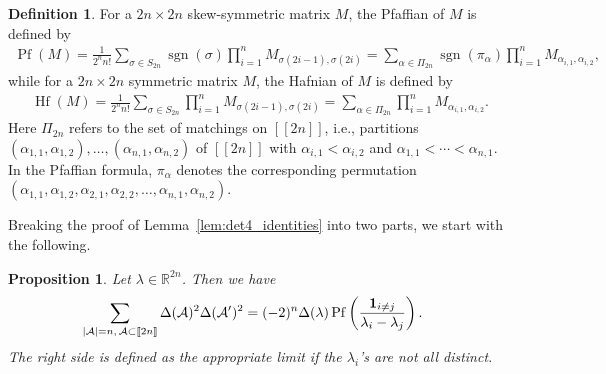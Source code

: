 \documentclass[pdftex]{sigma}
\numberwithin{equation}{section}
\newtheorem{Proposition}[Theorem]{Proposition}
\theoremstyle{definition}
\newtheorem{Definition}[Theorem]{Definition}
\newcommand{\R}{{\mathbb R}}
\newcommand{\ind}{{\bf{1}}}
\newcommand{\sgn}{\operatorname{sgn}}
\newcommand{\Pf}{\operatorname{Pf}}
\newcommand{\Hf}{\operatorname{Hf}}
\newcommand{\cA}{\mathcal{A}}
\newcommand{\lst}[1]{[\![#1 ]\!]}
\begin{document}
\begin{Definition}\label{def:PfaffHaf}
For a $2n \times 2n$ skew-symmetric matrix $M$, the Pfaffian of $M$ is defined by
\begin{align}\label{eq:Pfaffiandef}
 \Pf(M)=\frac{1}{2^n n!} \sum_{\sigma\in S_{2n}} \sgn(\sigma) \prod_{i=1}^n M_{{\sigma(2i-1)},{\sigma(2i)}}
 = \sum_{\alpha\in \Pi_{2n}} \sgn(\pi_\alpha) \prod_{i=1}^n M_{\alpha_{i,1},\alpha_{i,2}},
\end{align}
while for a $2n \times 2n$ symmetric matrix $M$, the Hafnian of $M$ is defined by
\begin{align}\label{eq:Hafniandef}
 \Hf(M)=\frac{1}{2^n n!} \sum_{\sigma\in S_{2n}} \prod_{i=1}^n M_{{\sigma(2i-1)},{\sigma(2i)}}
 =\sum_{\alpha\in \Pi_{2n}} \prod_{i=1}^n M_{\alpha_{i,1},\alpha_{i,2}}.
\end{align}
Here $\Pi_{2n}$ refers to the set of matchings on $\lst{2n}$, i.e., partitions $(\alpha_{1,1},\alpha_{1,2}), \dots, (\alpha_{n,1},\alpha_{n,2})$ of $\lst{2n}$ with $\alpha_{i,1}<\alpha_{i,2}$ and $\alpha_{1,1}<\cdots<\alpha_{n,1}$. In the Pfaffian formula, $\pi_\alpha$ denotes the corresponding permutation $(\alpha_{1,1},\alpha_{1,2}, \alpha_{2,1},\alpha_{2,2},\dots, \alpha_{n,1},\alpha_{n,2})$.
\end{Definition}

Breaking the proof of Lemma~\ref{lem:det4_identities} into two parts, we start with the following.

\begin{Proposition}\label{prop:det2+Pf}
Let ${\lambda}\in \R^{2n}$. Then we have
 \begin{align*}%
 \sum_{|\cA|=n,\, \cA\subset\lst{2n}} \Delta(\cA)^2 \Delta (\cA')^2&=(-2)^n \Delta (\lambda) \Pf\left(\frac{\ind_{i\neq j}}{\lambda_i-\lambda_j}\right).
 \end{align*}
The right side is defined as the appropriate limit if the $\lambda_i$'s are not all distinct.
\end{Proposition}
\end{document}
